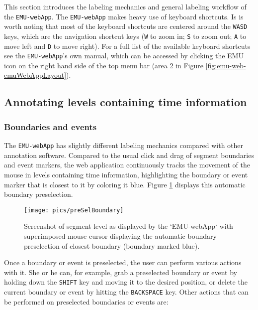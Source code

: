 \documentclass[
]{book}
\begin{document}
This section introduces the labeling mechanics and general labeling workflow of the \texttt{EMU-webApp}. The \texttt{EMU-webApp} makes heavy use of keyboard shortcuts. Is is worth noting that most of the keyboard shortcuts are centered around the \texttt{WASD} keys, which are the navigation shortcut keys (\texttt{W} to zoom in; \texttt{S} to zoom out; \texttt{A} to move left and \texttt{D} to move right). For a full list of the available keyboard shortcuts see the \texttt{EMU-webApp}'s own manual, which can be accessed by clicking the EMU icon on the right hand side of the top menu bar (area 2 in Figure \ref{fig:emu-web-emuWebAppLayout}).

\hypertarget{annotating-levels-containing-time-information}{%
\subsection{Annotating levels containing time information}\label{annotating-levels-containing-time-information}}

\hypertarget{boundaries-and-events}{%
\subsubsection*{Boundaries and events}\label{boundaries-and-events}}

The \texttt{EMU-webApp} has slightly different labeling mechanics compared with other annotation software. Compared to the usual click and drag of segment boundaries and event markers, the web application continuously tracks the movement of the mouse in levels containing time information, highlighting the boundary or event marker that is closest to it by coloring it blue. Figure \ref{fig:webApp-preSelBoundary} displays this automatic boundary preselection.

\begin{figure}

{\centering \texttt{[image: pics/preSelBoundary]} 

}

\caption{Screenshot of segment level as displayed by the `EMU-webApp` with superimposed mouse cursor displaying the automatic boundary preselection of closest boundary (boundary marked blue).}\label{fig:webApp-preSelBoundary}
\end{figure}

Once a boundary or event is preselected, the user can perform various actions with it. She or he can, for example, grab a preselected boundary or event by holding down the \texttt{SHIFT} key and moving it to the desired position, or delete the current boundary or event by hitting the \texttt{BACKSPACE} key. Other actions that can be performed on preselected boundaries or events are:
\end{document}
